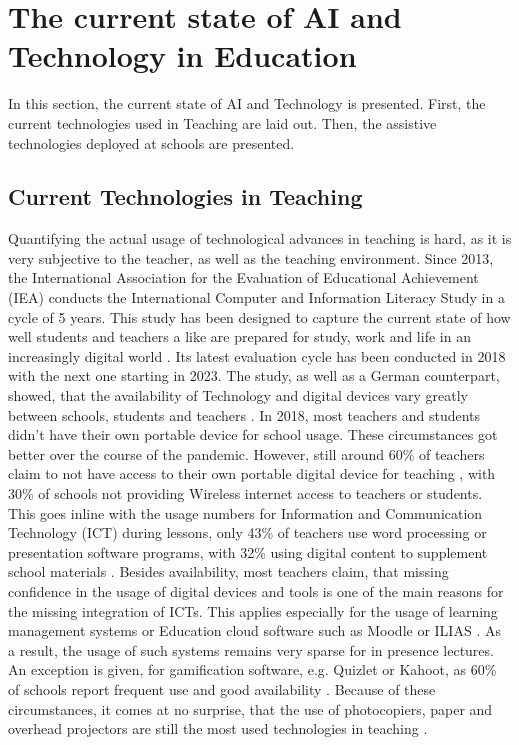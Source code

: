 \documentclass{Academic}
\begin{document}
    \section{The current state of AI and Technology in Education}
    In this section, the current state of AI and Technology is presented. First, the current technologies used in Teaching are laid out. Then, the assistive technologies deployed at schools are presented.

    \subsection{Current Technologies in Teaching}
    Quantifying the actual usage of technological advances in teaching is hard, as it is very subjective to the teacher, as well as the teaching environment. Since 2013, the International Association for the Evaluation of Educational Achievement (IEA) conducts the International Computer and Information Literacy Study in a cycle of 5 years. This study has been designed to capture the current state of how well students and teachers a like are prepared for study, work and life in an increasingly digital world \cite{noauthor_icils_nodate}. Its latest evaluation cycle has been conducted in 2018 with the next one starting in 2023. The study, as well as a German counterpart, showed, that the availability of Technology and digital devices vary greatly between schools, students and teachers \cite{musmann_digitalisierung_2021}. In 2018, most teachers and students didn't have their own portable device for school usage. These circumstances got better over the course of the pandemic. However, still around 60\% of teachers claim to not have access to their own portable digital device for teaching \cite{musmann_digitalisierung_2021}, with 30\% of schools not providing Wireless internet access to teachers or students. This goes inline with the usage numbers for Information and Communication Technology (ICT) during lessons, only 43\% of teachers use word processing or presentation software programs, with 32\% using digital content to supplement school materials \cite{noauthor_icils_nodate}. Besides availability, most teachers claim, that missing confidence in the usage of digital devices and tools is one of the main reasons for the missing integration of ICTs. This applies especially for the usage of learning management systems or Education cloud software such as Moodle or ILIAS \cite{noauthor_icils_nodate}. As a result, the usage of such systems remains very sparse for in presence lectures. An exception is given, for gamification software, e.g. Quizlet or Kahoot, as 60\% of schools report frequent use and good availability \cite{noauthor_icils_nodate}. Because of these circumstances, it comes at no surprise, that the use of photocopiers, paper and overhead projectors are still the most used technologies in teaching \cite{noauthor_202122_nodate}.
\end{document}

